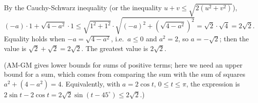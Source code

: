 By the Cauchy-Schwarz inequality (or the inequality $u+v\le\sqrt{2(u^2+v^2)}$),
\[
(-a)\cdot1+\sqrt{4-a^2}\cdot1\le\sqrt{1^2+1^2}\cdot\sqrt{(-a)^2+\left(\sqrt{4-a^2}\right)^2}=\sqrt2\cdot\sqrt{4}=2\sqrt2 .
\]
Equality holds when $-a=\sqrt{4-a^2}$, i.e.\ $a\le0$ and $a^2=2$, so $a=-\sqrt2$; then the value is $\sqrt2+\sqrt2=2\sqrt2$. The greatest value is $\boxed{2\sqrt2}$.

(AM-GM gives lower bounds for sums of positive terms; here we need an upper bound for a sum, which comes from comparing the sum with the sum of squares $a^2+(4-a^2)=4$. Equivalently, with $a=2\cos t$, $0\le t\le\pi$, the expression is $2\sin t-2\cos t=2\sqrt2\sin(t-45^\circ)\le2\sqrt2$.)
